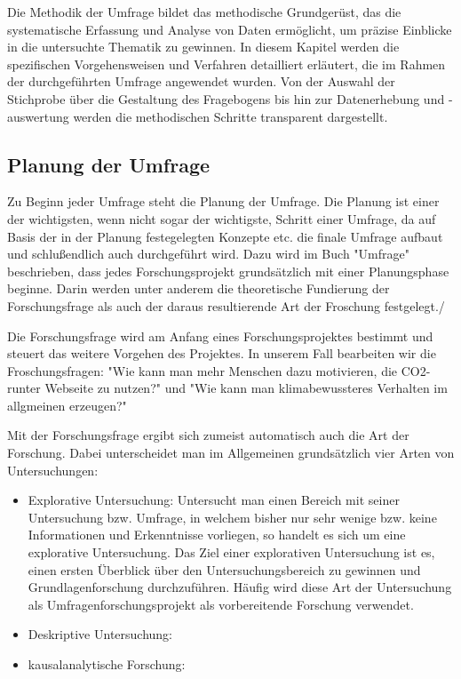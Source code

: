 Die Methodik der Umfrage bildet das methodische Grundgerüst, das die systematische Erfassung und Analyse von Daten ermöglicht, um präzise Einblicke in die untersuchte Thematik zu gewinnen. In diesem Kapitel werden die spezifischen Vorgehensweisen und Verfahren detailliert erläutert, die im Rahmen der durchgeführten Umfrage angewendet wurden.
Von der Auswahl der Stichprobe über die Gestaltung des Fragebogens bis hin zur Datenerhebung und -auswertung werden die methodischen Schritte transparent dargestellt.

\subsection{Planung der Umfrage}
Zu Beginn jeder Umfrage steht die Planung der Umfrage. Die Planung ist einer der wichtigsten, wenn nicht sogar der wichtigste, Schritt einer Umfrage, da auf Basis der in der Planung festegelegten Konzepte etc. die finale Umfrage aufbaut und schlußendlich auch durchgeführt wird.
Dazu wird im Buch "Umfrage" beschrieben, dass jedes Forschungsprojekt grundsätzlich mit einer Planungsphase beginne. Darin werden unter anderem die theoretische Fundierung der Forschungsfrage als auch der daraus resultierende Art der Froschung festgelegt./ \cite{umfrage:2011}

Die Forschungsfrage wird am Anfang eines Forschungsprojektes bestimmt und steuert das weitere Vorgehen des Projektes. \cite{umfrage:2011}
In unserem Fall bearbeiten wir die Froschungsfragen: "Wie kann man mehr Menschen dazu motivieren, die CO2-runter Webseite zu nutzen?" und "Wie kann man klimabewussteres Verhalten im allgmeinen erzeugen?"\

Mit der Forschungsfrage ergibt sich zumeist automatisch auch die Art der Forschung. Dabei unterscheidet man im Allgemeinen grundsätzlich vier Arten von Untersuchungen:

\begin{itemize}
    \item Explorative Untersuchung: Untersucht man einen Bereich mit seiner Untersuchung bzw. Umfrage, in welchem bisher nur sehr wenige bzw. keine Informationen und Erkenntnisse vorliegen, so handelt es sich um eine explorative Untersuchung. Das Ziel einer explorativen Untersuchung ist es, einen ersten Überblick über den Untersuchungsbereich zu gewinnen und Grundlagenforschung durchzuführen. Häufig wird diese Art der Untersuchung als Umfragenforschungsprojekt als vorbereitende Forschung verwendet. \cite{umfrage:2011}
    \item Deskriptive Untersuchung:
    \item kausalanalytische Forschung:
\end{itemize}
